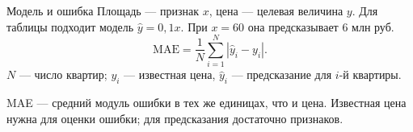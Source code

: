 \begin{frame}{Модель и ошибка}
  Площадь --- признак $x$, цена --- целевая величина $y$.
  Для таблицы подходит модель $\widehat y=0{,}1x$.
  При $x=60$ она предсказывает $6$ млн руб.
  \[
    \mathrm{MAE}=\frac1N\sum_{i=1}^{N}|\widehat y_i-y_i|.
  \]
  $N$ --- число квартир; $y_i$ --- известная цена,
  $\widehat y_i$ --- предсказание для $i$-й квартиры.
  \medskip\par
  MAE --- средний модуль ошибки в тех же единицах, что и цена.
  Известная цена нужна для оценки ошибки; для предсказания достаточно признаков.
\end{frame}
